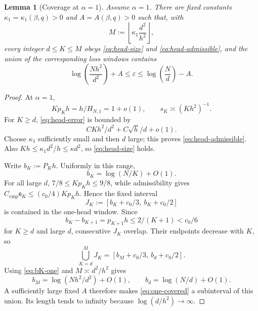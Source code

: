 \documentclass[11pt]{article}
\newtheorem{lemma}[lemma]{Lemma}
\theoremstyle{definition}
\newcommand{\eps}{\varepsilon}
\begin{document}
\begin{lemma}[Coverage at $\alpha=1$]
\label{lem:one-coverage}
Assume $\alpha=1$.  There are fixed constants
$\kappa_1=\kappa_1(\beta,q)>0$ and $A=A(\beta,q)>0$ such that, with
\[
 M:=\left\lfloor\kappa_1\frac{d^2}{h^2}\right\rfloor,
\]
every integer $d\leq K\leq M$ obeys
\eqref{eq:head-size} and \eqref{eq:head-admissible}, and the union of
the corresponding loss windows contains
\begin{equation}
 \log\!\left(\frac{Nh^2}{d^2}\right)+A
 \leq\eps\leq
 \log\!\left(\frac Nd\right)-A.
 \label{eq:one-covered}
\end{equation}
\end{lemma}

\begin{proof}
At $\alpha=1$,
\[
 Kp_Kh=h/H_{N,1}=1+o(1),
 \qquad s_K\asymp(Kh^2)^{-1}.
\]
For $K\geq d$, \eqref{eq:head-error} is bounded by
\[
 CKh^2/d^2+C\sqrt h/d+o(1).
\]
Choose $\kappa_1$ sufficiently small and then $d$ large; this proves
\eqref{eq:head-admissible}.  Also
$Kh\leq\kappa_1d^2/h\leq\kappa d^2$, so
\eqref{eq:head-size} holds.

Write $b_K:=P_Kh$.  Uniformly in this range,
\begin{equation}
 b_K=\log(N/K)+O(1).
 \label{eq:bK-one}
\end{equation}
For all large $d$, $7/8\leq Kp_Kh\leq9/8$, while admissibility gives
$C_{\mathrm{cmp}}\mathsf e_K\leq(c_0/4)Kp_Kh$.  Hence the fixed interval
\[
 J_K:=[b_K+c_0/3,\ b_K+c_0/2]
\]
is contained in the one-head window.  Since
\[
 b_K-b_{K+1}=p_{K+1}h\leq2/(K+1)<c_0/6
\]
for $K\geq d$ and large $d$, consecutive $J_K$ overlap.  Their
endpoints decrease with $K$, so
\[
 \bigcup_{K=d}^M J_K=[b_M+c_0/3,\ b_d+c_0/2].
\]
Using \eqref{eq:bK-one} and
$M\asymp d^2/h^2$ gives
\[
 b_M=\log(Nh^2/d^2)+O(1),
 \qquad b_d=\log(N/d)+O(1).
\]
A sufficiently large fixed $A$ therefore makes
\eqref{eq:one-covered} a subinterval of this union.  Its length tends
to infinity because $\log(d/h^2)\to\infty$.
\end{proof}
\end{document}

